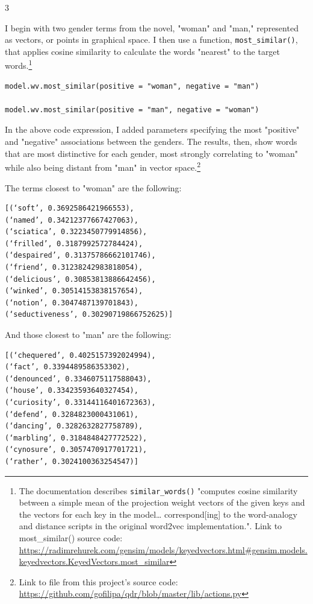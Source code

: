 \documentclass[11pt]{article}
\begin{document}
3

I begin with two gender terms from the novel, "woman" and "man,"
represented as vectors, or points in graphical space. I then use a
function, \texttt{most\_similar()}, that applies cosine similarity to
calculate the words "nearest" to the target words.\footnote{The documentation describes \texttt{similar\_words()} "computes
cosine similarity between a simple mean of the projection weight
vectors of the given keys and the vectors for each key in the model\ldots{}
correspond[ing] to the word-analogy and distance scripts in the
original word2vec implementation.". Link to most\_similar() source
code:
\url{https://radimrehurek.com/gensim/models/keyedvectors.html\#gensim.models.keyedvectors.KeyedVectors.most\_similar}}

\begin{verbatim}
model.wv.most_similar(positive = "woman", negative = "man")

model.wv.most_similar(positive = "man", negative = "woman")
\end{verbatim}

In the above code expression, I added parameters specifying the most
"positive" and "negative" associations between the genders. The
results, then, show words that are most distinctive for each gender,
most strongly correlating to "woman" while also being distant from
"man" in vector space.\footnote{Link to file from this project's source code:
\url{https://github.com/gofilipa/qdr/blob/master/lib/actions.py}}

The terms closest to "woman" are the following:

\begin{verbatim}
[(‘soft’, 0.3692586421966553), 
(‘named’, 0.34212377667427063), 
(‘sciatica’, 0.3223450779914856), 
(‘frilled’, 0.3187992572784424), 
(‘despaired’, 0.31375786662101746), 
(‘friend’, 0.31238242983818054), 
(‘delicious’, 0.30853813886642456), 
(‘winked’, 0.30514153838157654), 
(‘notion’, 0.3047487139701843), 
(‘seductiveness’, 0.30290719866752625)]
\end{verbatim}

And those closest to "man" are the following:

\begin{verbatim}
[(‘chequered’, 0.4025157392024994), 
(‘fact’, 0.3394489586353302), 
(‘denounced’, 0.3346075117588043), 
(‘house’, 0.33423593640327454), 
(‘curiosity’, 0.33144116401672363), 
(‘defend’, 0.3284823000431061), 
(‘dancing’, 0.3282632827758789), 
(‘marbling’, 0.3184848427772522), 
(‘cynosure’, 0.3057470917701721), 
(‘rather’, 0.3024100363254547)]   
\end{verbatim}
\end{document}
